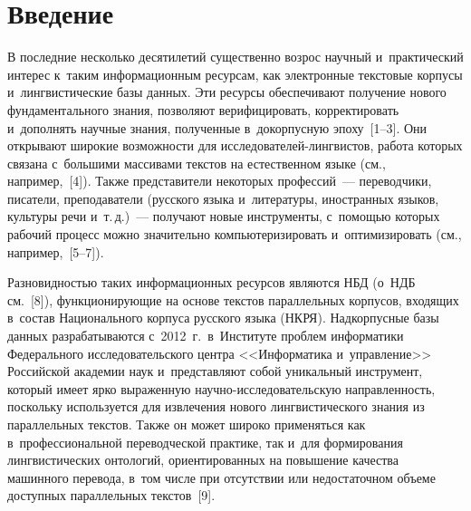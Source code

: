  
\vspace*{4pt}



\thispagestyle{headings}

\begin{multicols}{2}

\label{st\stat}

  
  \section{Введение}
  
  \vspace*{-3pt}
  
  В последние несколько десятилетий существенно возрос научный 
и~практический интерес к~таким информационным ресурсам, как электронные 
текстовые корпусы и~лингвистические базы данных. Эти ресурсы обеспечивают 
получение нового фундаментального знания, позволяют верифицировать, 
корректировать и~дополнять научные знания, полученные в~докорпусную 
эпоху~[1--3]. Они открывают широкие возможности для 
ис\-сле\-до\-ва\-те\-лей-лин\-г\-вис\-тов, 
работа которых связана с~большими массивами текстов на 
естественном языке (см., например,~[4]). Также представители некоторых 
профессий~--- переводчики, писатели, преподаватели (русского языка 
и~литературы, иностранных языков, культуры речи и~т.\,д.)~--- получают новые 
инструменты, с~помощью которых рабочий процесс можно значительно 
компьютеризировать и~оптимизировать (см., например,~[5--7]).
  
  Разновидностью таких информационных ресурсов являются НБД (о~НДБ 
см.~[8]), функционирующие на основе текстов параллельных корпусов, входящих 
в~состав Национального корпуса русского языка (НКРЯ). Надкорпусные
 базы данных разрабатываются 
с~2012~г.\ в~Институте проб\-лем информатики Федерального исследовательского 
центра <<Информатика и~управ\-ле\-ние>> Российской академии наук 
и~пред\-став\-ля\-ют собой уникальный инструмент, который имеет ярко выраженную 
на\-уч\-но-ис\-сле\-до\-ва\-тель\-скую на\-прав\-лен\-ность, поскольку используется для 
извлечения нового лингвистического знания из параллельных текстов. Также он 
может широко применяться как в~профессиональной переводческой практике, 
так и~для формирования лингвистических онтологий, ориентированных на 
повышение качества машинного перевода, в~том числе при отсутствии или 
недостаточном объеме доступных параллельных текстов~[9].


\end{multicols}
